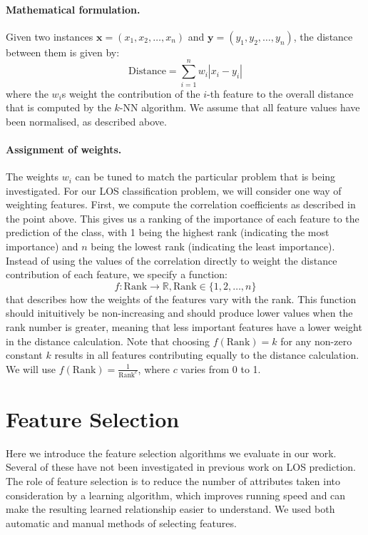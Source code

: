 \documentclass{article}
\begin{document}
\paragraph{Mathematical formulation.}
Given two instances $\mathbf{x} = (x_1,x_2,\ldots,x_n)$ and
$\mathbf{y} = (y_1,y_2,\ldots,y_n)$, the distance between them is given by:
\begin{equation*}
\mathrm{Distance} = \sum_{i=1}^n w_i |x_i-y_i|
\end{equation*}
where the $w_i$s weight the contribution of the $i$-th feature to the overall
distance that is computed by the $k$-NN algorithm. We assume that all feature
values have been normalised, as described above.

\paragraph{Assignment of weights.}
The weights $w_i$ can be tuned to match the particular problem that is being
investigated. For our LOS classification problem, we will consider one way
of weighting features.
First, we compute the correlation coefficients as described in the point above.
This gives us a ranking of the importance of each feature to the prediction of
the class, with 1 being the highest rank (indicating the most importance) and
$n$ being the lowest rank (indicating the least importance).
Instead of using the values of the correlation directly to weight
the distance contribution of each feature, we specify a function:
\begin{equation*}
f : \mathrm{Rank} \rightarrow \mathbb{R}, \mathrm{Rank} \in \{1,2,\ldots,n\}
\end{equation*}
that describes
how the weights of the features vary with the rank. This function should
inituitively be non-increasing and should produce lower values when the rank
number is greater, meaning that less important features have a lower weight
in the distance calculation.
Note that choosing $f(\mathrm{Rank}) = k$ for any non-zero constant $k$
results in all features contributing equally to the distance calculation.
We will use $f(\mathrm{Rank}) = \frac{1}{\mathrm{Rank}^c}$, where
$c$ varies from 0 to 1.

\section{Feature Selection}
\label{sec:features}
Here we introduce the feature selection algorithms we evaluate in our work.
Several of these have not been investigated in previous work on LOS prediction.
The role of feature selection is to reduce the number of attributes taken into
consideration by a learning algorithm, which improves running speed and can
make the resulting learned relationship easier to understand. We used both
automatic and manual methods of selecting features.
\end{document}

